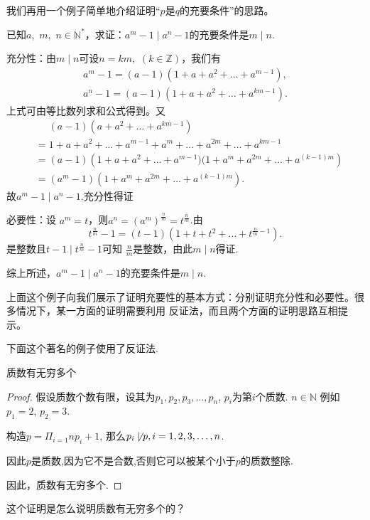 我们再用一个例子简单地介绍证明“$p$是$q$的充要条件”的思路。
\begin{example}
    已知$a$,~$m$,~$n\in \mathbb{N^*}$，求证：$a^m-1\mid a^n-1$的充要条件是$m\mid n$.
\end{example}
\begin{prove}
    充分性：由$m\mid n$可设$n=km$,~$(k\in \mathbb{Z})$，我们有
    \[
        \begin{aligned}
            a^m-1=(a-1)(1+a+a^2+\dots +a^{m-1}), \\
            a^n-1=(a-1)(1+a+a^2+\dots +a^{km-1}).
        \end{aligned}
    \]
    上式可由等比数列求和公式得到。又
    \[
        \begin{aligned}
             & \mathrel{\phantom{=}} (a-1)\left( a+a^2+\dots +a^{km-1} \right)               \\
             & =  1+a+a^2+\dots +a^{m-1}+a^m+\dots+a^{2m}+\dots+a^{km-1}                     \\
             & =  (a-1)\left( 1+a+a^2+\dots +a^{m-1})(1+a^m+a^{2m}+\dots +a^{(k-1)m} \right) \\
             & =  (a^m-1)\left( 1+a^m+a^{2m}+\dots +a^{(k-1)m} \right) .
        \end{aligned}
    \]
    故$a^m-1\mid a^n-1$.充分性得证


    必要性：设 $a^m=t$，则$a^n=(a^m)^{\frac{n}{m}}=t^{\frac{n}{m}}$.由
    \[
        t^{\frac{n}{m}}-1=(t-1)\left( 1+t+t^2+\dots +t^{\frac{n}{m}-1} \right)
        .\]
    是整数且$t-1\mid t^{\frac{n}{m}}-1$可知
    $\frac{n}{m}$是整数，由此$m\mid n$得证.


    综上所述，$a^m-1\mid a^n-1$的充要条件是$m\mid n$.

\end{prove}

上面这个例子向我们展示了证明充要性的基本方式：分别证明充分性和必要性。很多情况下，某一方面的证明需要利用
反证法，而且两个方面的证明思路互相提示。

下面这个著名的例子使用了反证法.

\begin{example}
    质数有无穷多个
\end{example}
\begin{proof}
    假设质数个数有限，设其为$p_1, p_2, p_3, \ldots, p_n$, $p_i$为第$i$个质数. $n\in \mathbb{N}$
    例如$p_1 = 2$, $p_2 = 3$.

    构造$p = \Pi_{i=1}{n}p_i + 1$, 那么$p_i \not\mid p, i=1,2,3,\ldots,n$.

    因此$p$是质数,因为它不是合数,否则它可以被某个小于$p$的质数整除.

    因此，质数有无穷多个.
\end{proof}
\begin{questionbox}
    这个证明是怎么说明质数有无穷多个的？
\end{questionbox}

